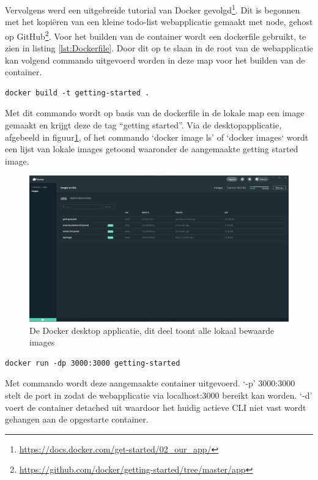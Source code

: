 Vervolgens werd een uitgebreide tutorial van Docker gevolgd\footnote{\url{https://docs.docker.com/get-started/02_our_app/}}. Dit is begonnen met het kopiëren van een kleine todo-list webapplicatie gemaakt met node, gehost op GitHub\footnote{\url{https://github.com/docker/getting-started/tree/master/app}}. Voor het builden van de container wordt een dockerfile gebruikt, te zien in listing \ref{lst:Dockerfile}. Door dit op te slaan in de root van de webapplicatie kan volgend commando uitgevoerd worden in deze map voor het builden van de container.
\begin{verbatim}
docker build -t getting-started .
\end{verbatim}
Met dit commando wordt op basis van de dockerfile in de lokale map een image gemaakt en krijgt deze de tag “getting started”. Via de desktopapplicatie, afgebeeld in figuur\ref{fig:Dockerdesktop}, of het commando `docker image ls' of `docker images` wordt een lijst van lokale images getoond waaronder de aangemaakte getting started image.
\begin{figure}[h]
    \includegraphics[width=\linewidth]{img/dockerImg.png}
    \caption[De Docker desktop applicatie]{De Docker desktop applicatie, dit deel toont alle lokaal bewaarde images}
    \label{fig:Dockerdesktop}
    \centering
\end{figure}
\begin{verbatim}
docker run -dp 3000:3000 getting-started
\end{verbatim}
Met commando wordt deze aangemaakte container uitgevoerd. ‘-p’ 3000:3000 stelt de port in zodat de webapplicatie via localhost:3000 bereikt kan worden. ‘-d’ voert de container detached uit waardoor het huidig actieve CLI niet vast wordt gehangen aan de opgestarte container.

